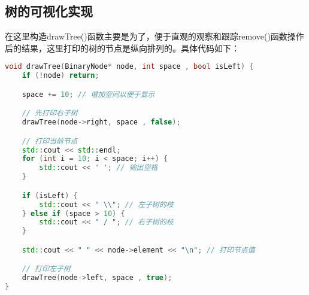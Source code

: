\documentclass[fontset=fandol]{ctexart}
\begin{document}
\subsection{树的可视化实现}
在这里构造drawTree()函数主要是为了，便于直观的观察和跟踪remove()函数操作后的结果，这里打印的树的节点是纵向排列的。具体代码如下：
\begin{lstlisting}[language=C++, caption={draw()函数}]  
void drawTree(BinaryNode* node, int space , bool isLeft) {
    if (!node) return;

    space += 10; // 增加空间以便于显示

    // 先打印右子树
    drawTree(node->right, space , false);

    // 打印当前节点
    std::cout << std::endl;
    for (int i = 10; i < space; i++) {
        std::cout << ' '; // 输出空格
    }

    if (isLeft) {
        std::cout << " \\"; // 左子树的枝
    } else if (space > 10) {
        std::cout << " / "; // 右子树的枝
    }

    std::cout << " " << node->element << "\n"; // 打印节点值

    // 打印左子树
    drawTree(node->left, space , true);
}
\end{lstlisting}
\end{document}
